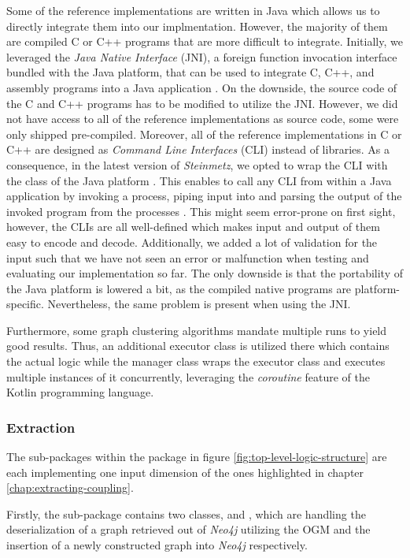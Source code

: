 \documentclass[12pt,a4paper]{report}
\begin{document}
Some of the reference implementations are written in Java which allows us to directly
integrate them into our implmentation. However, the majority of them are compiled C or
C++ programs that are more difficult to integrate.
Initially, we leveraged the \textit{Java Native Interface} (JNI), a foreign function
invocation interface bundled with the Java platform, that can be used to integrate
C, C++, and assembly programs into a Java application \cite{jni}.
On the downside, the source code of the C and C++ programs has to be modified to utilize
the JNI. However, we did not have access to all of the reference implementations as source
code, some were only shipped pre-compiled.
Moreover, all of the reference implementations in C or C++ are designed as
\textit{Command Line Interfaces} (CLI) instead of libraries.
As a consequence, in the latest version of \textit{Steinmetz}, we opted to wrap the
CLI with the  class of the Java platform \cite{process-builder}.
This enables to call any CLI from within a Java application by invoking a process,
piping input into  and parsing the output of the invoked program from
the processes . This might seem error-prone on first sight, however,
the CLIs are all well-defined which makes input and output of them easy to
encode and decode.
Additionally, we added a lot of validation for the input such that we have not seen
an error or malfunction when testing and evaluating our implementation so far.
The only downside is that the portability of the Java platform is lowered a bit,
as the compiled native programs are platform-specific. Nevertheless, the same problem
is present when using the JNI.

Furthermore, some graph clustering algorithms mandate multiple runs to yield good results.
Thus, an additional executor class is utilized there which contains the actual logic while
the manager class wraps the executor class and executes multiple instances of it concurrently,
leveraging the \textit{coroutine} feature of the Kotlin programming language.


\subsubsection{Extraction}
The sub-packages within the package  in figure
\ref{fig:top-level-logic-structure} are each implementing one input dimension of the
ones highlighted in chapter \ref{chap:extracting-coupling}.

Firstly, the sub-package  contains two classes,
 and , which are handling the deserialization
of a graph retrieved out of \textit{Neo4j} utilizing the OGM and the insertion of
a newly constructed graph into \textit{Neo4j} respectively.
\end{document}
